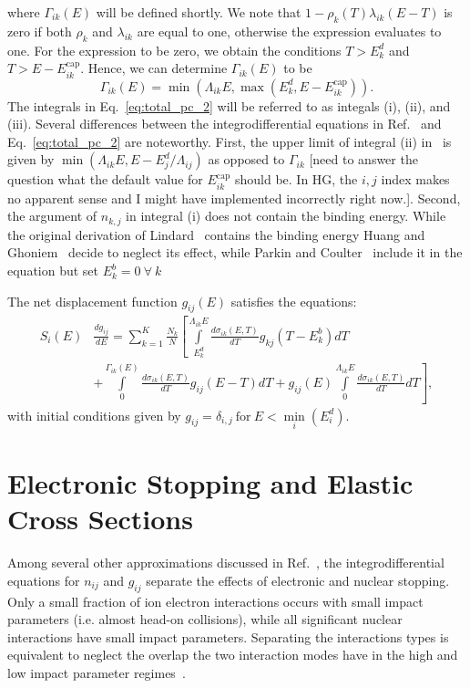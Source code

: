 \documentclass[review]{elsarticle}
\begin{document}
where $\Gamma_{ik}(E)$ will be defined shortly. We note that $1 - \rho_k(T) \lambda_{ik}(E-T)$ is zero if both $\rho_k$ and $\lambda_{ik}$ are equal to one, otherwise the expression evaluates to one. For the expression to be zero, we obtain the conditions $T > E_k^d$ and $T > E - E_{ik}^{\text{cap}}$. Hence, we can determine $\Gamma_{ik}(E)$ to be
\[
\Gamma_{ik}(E) = \min \left( \Lambda_{ik} E, \max \left( E_k^d, E - E_{ik}^{\text{cap}} \right)  \right).
\]
The integrals in Eq.~\ref{eq:total_pc_2} will be referred to as integals (i), (ii), and (iii).
Several differences between the integrodifferential equations in Ref.~\cite{Huang1993} and Eq.~\ref{eq:total_pc_2} are noteworthy. First,
the upper limit of integral (ii) in~\cite{Huang1993} is given by $\min \left( \Lambda_{ik} E, E - E_{j}^d / \Lambda_{ij}  \right)$ as opposed to $\Gamma_{ik}$ [need to answer the question what the default value for $E_{ik}^{\text{cap}}$ should be. In HG, the $i,j$ index makes no apparent sense and I might have implemented incorrectly right now.]. Second, the argument of $n_{k,j}$ in integral (i) does not contain the binding energy. While the original derivation of Lindard~\cite{Lindhard1963} contains the binding energy Huang and Ghoniem~\cite{Huang1993} decide to neglect its effect, while Parkin and Coulter~\cite{PC1981} include it in the equation but set $E^b_k = 0 ~\forall ~k$ 

The net displacement function $g_{ij}(E)$ satisfies the equations:
\begin{align}\label{eq:net_pc_1}
  S_{i}(E) &\frac{d g_{ij}}{dE}  = \sum\limits_{k=1}^K \frac{N_k}{N}   \left[ \int\limits_{E_k^d}^{\Lambda_{ik}E}  \frac{d \sigma_{ik} (E,T)}{dT}
   g_{kj}(T-E_k^b)  dT
    \right . \nonumber \\
    & \left . +\int\limits_{0}^{\Gamma_{ik}(E)}  \frac{d \sigma_{ik} (E,T)}{dT}  g_{ij}(E-T) dT +g_{ij}(E) \int\limits_{0}^{\Lambda_{ik}E}  \frac{d \sigma_{ik} (E,T)}{dT}   dT \right ] ,
\end{align}
with initial conditions given by $g_{ij}=\delta_{i,j}~\text{for}~E < \min\limits_i (E_i^d)$.

\section{Electronic Stopping and Elastic Cross Sections}
Among several other approximations discussed in Ref.~\cite{Lindhard1963}, the integrodifferential equations for $n_{ij}$ and $g_{ij}$ separate the effects of electronic and nuclear stopping. Only a small fraction of ion electron interactions occurs with small impact parameters (i.e. almost head-on collisions), while all significant nuclear interactions have small impact parameters. Separating the interactions types is equivalent to neglect the overlap the two interaction modes have in the high and low impact parameter regimes~\cite{Lindhard1963}.
\end{document}
